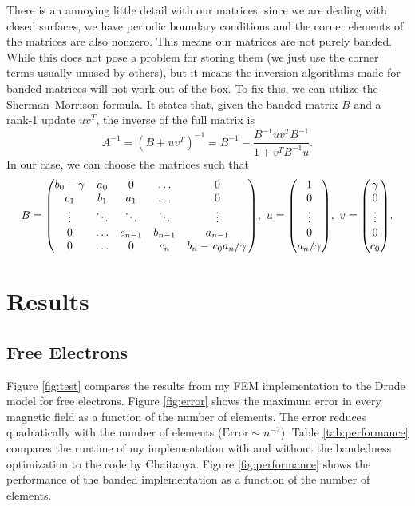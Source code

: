 \documentclass[12pt]{article}
\begin{document}
There is an annoying little detail with our matrices: since we are dealing with closed surfaces,
we have periodic boundary conditions and the corner elements of the matrices are also nonzero. This
means our matrices are not purely banded. While this does not pose a problem for storing them (we
just use the corner terms usually unused by others), but it means the inversion algorithms made for
banded matrices will not work out of the box. To fix this, we can utilize the Sherman--Morrison
formula. It states that, given the banded matrix $B$ and a rank-1 update $uv^T$, the inverse of the
full matrix is
\begin{equation}
    A^{-1} = (B + uv^T)^{-1} = B^{-1} - \frac{B^{-1}uv^TB^{-1}}{1 + v^TB^{-1}u}.
\end{equation}
In our case, we can choose the matrices such that
\begin{equation}
    B = \mqty(b_0 - \gamma & a_0 & 0 & \dots & 0 \\
          c_1 & b_1 & a_1 & \dots & 0 \\
          \vdots & \ddots & \ddots & \ddots & \vdots \\
          0 & \dots & c_{n-1} & b_{n-1} & a_{n-1} \\
          0 & \dots & 0 & c_n & b_n - \flatfrac{c_0a_n}{\gamma}),\ 
    u = \mqty(1 \\ 0 \\ \vdots \\ 0 \\ a_n/\gamma),\ 
    v = \mqty(\gamma \\ 0 \\ \vdots \\ 0 \\ c_0).
\end{equation}

\section{Results}
\subsection{Free Electrons}

Figure \ref{fig:test} compares the results from my FEM implementation to the Drude model for free
electrons. Figure \ref{fig:error} shows the maximum error in every magnetic field as a function of
the number of elements. The error reduces quadratically with the number of elements
($\mathrm{Error}\sim n^{-2}$). Table \ref{tab:performance} compares the runtime of my implementation
with and without the bandedness optimization to the code by Chaitanya. Figure \ref{fig:performance}
shows the performance of the banded implementation as a function of the number of elements.
\end{document}
